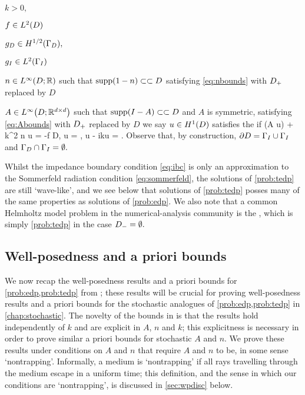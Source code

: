   \bit
  \item $k > 0,$
\item $f \in \LtD$
\item $\gD \in \HhGD,$
  \item $\gI \in \LtGI$
\item $n \in \LiDRR$ such that $\supp\mleft(1-n\mright) \compcont D$ satisfying \eqref{eq:nbounds} with $D_{+}$ replaced by $D$
\item $A \in \LiDRRdtd$ such that $\supp\mleft(I-A\mright)\compcont D$ and $A$ is symmetric, satisfying \eqref{eq:Abounds} with $D_{+}$ replaced by $D$
  \eit
  we say $u \in \HoD$ satisfies the  if
  \beq\label{eq:tedp}
\grad \cdot \mleft(A \grad u\mright) + k^2 n u = -f \tin D,
\eeq
\beqs
\trGD u = \gD, \ton \GD \tand
\eeqs
\beq\label{eq:ibc}
\dn u - ik\trGI u = \gI \ton \GI.
\eeq
\eprob
Observe that, by construction, $\partial D = \Gamma_{I} \cup \Gamma_{I}$ and $\Gamma_{D} \cap \Gamma_{I} = \emptyset.$

Whilst the impedance boundary condition \eqref{eq:ibc} is only an approximation to the Sommerfeld radiation condition \eqref{eq:sommerfeld}, the solutions of \cref{prob:tedp} are still `wave-like', and we  see below that solutions of \cref{prob:tedp} posses many of the same properties as solutions of \cref{prob:edp}. We also note that a common Helmholtz model problem in the numerical-analysis community is the , which is simply \cref{prob:tedp} in the case $D_{-} = \emptyset.$


  \subsection{Well-posedness and a priori bounds}\label{sec:wpbounds}

  We  now recap the well-posedness results and a priori bounds for \cref{prob:edp,prob:tedp} from \cite{GrPeSp:19}; these results will be crucial for proving well-posedness results and a priori bounds for the stochastic analogues of \cref{prob:edp,prob:tedp} in \cref{chap:stochastic}. The novelty of the bounds in \cite{GrPeSp:19} is that the results hold independently of $k$ and are explicit in $A$, $n$ and $k$; this explicitness is necessary in order to prove similar a priori bounds for stochastic $A$ and $n$. We prove these results under conditions on $A$ and $n$ that require $A$ and $n$ to be, in some sense `nontrapping'. Informally, a medium is `nontrapping' if all rays travelling through the medium escape in a uniform time; this definition, and the sense in which our conditions are `nontrapping', is discussed in \cref{sec:wpdisc} below.

